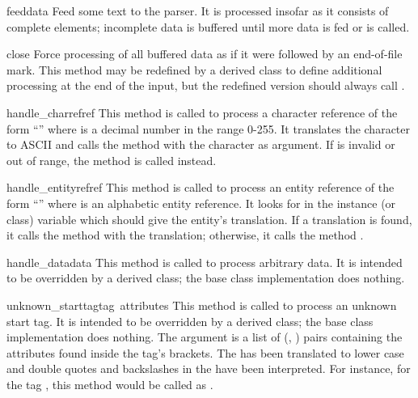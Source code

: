 \begin{funcdesc}{feed}{data}
Feed some text to the parser.  It is processed insofar as it consists
of complete elements; incomplete data is buffered until more data is
fed or  is called.
\end{funcdesc}

\begin{funcdesc}{close}{}
Force processing of all buffered data as if it were followed by an
end-of-file mark.  This method may be redefined by a derived class to
define additional processing at the end of the input, but the
redefined version should always call .
\end{funcdesc}

\begin{funcdesc}{handle_charref}{ref}
This method is called to process a character reference of the form
``'' where  is a decimal number in the
range 0-255.  It translates the character to ASCII and calls the
method  with the character as argument.  If
 is invalid or out of range, the method
 is called instead.
\end{funcdesc}

\begin{funcdesc}{handle_entityref}{ref}
This method is called to process an entity reference of the form
``'' where  is an alphabetic entity
reference.  It looks for  in the instance (or class)
variable  which should give the entity's translation.
If a translation is found, it calls the method 
with the translation; otherwise, it calls the method
.
\end{funcdesc}

\begin{funcdesc}{handle_data}{data}
This method is called to process arbitrary data.  It is intended to be
overridden by a derived class; the base class implementation does
nothing.
\end{funcdesc}

\begin{funcdesc}{unknown_starttag}{tag\, attributes}
This method is called to process an unknown start tag.  It is intended
to be overridden by a derived class; the base class implementation
does nothing.  The  argument is a list of
(, ) pairs containing the attributes found inside
the tag's \code{<>} brackets.  The  has been translated to
lower case and double quotes and backslashes in the  have
been interpreted.  For instance, for the tag
, this method would be
called as .
\end{funcdesc}


